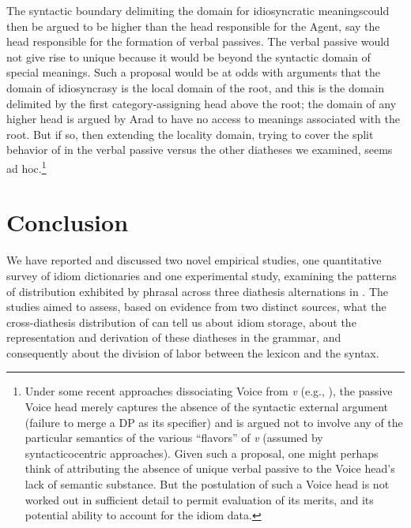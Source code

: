\documentclass[output=paper]{langsci/langscibook}
\begin{document}
The syntactic boundary delimiting the domain for idiosyncratic meanings\linebreak could
then be argued to be higher than the head responsible for the Agent, say the
head responsible for the formation of verbal passives. The verbal
passive would not give rise to unique  because it would
be beyond the syntactic domain of special meanings. Such a proposal would be at
odds with  arguments that the domain of idiosyncrasy is the
local domain of the root, and this is the domain delimited by the first
category-assigning head above the root; the domain of any higher head is argued
by Arad to have no access to meanings associated with the root. But if so, then
extending the locality domain, trying to cover the split behavior of
 in the verbal passive versus the other diatheses we examined,
seems ad hoc.\footnote{Under some recent approaches dissociating Voice from
    \emph{v} (e.g., \citealt{Harley2013}), the passive Voice head
    merely captures the absence of the syntactic external argument (failure to
    merge a DP as its specifier) and is argued not to involve any of the
    particular semantics of the various ``flavors'' of \emph{v} (assumed by
    syntacticocentric approaches). Given such a proposal, one might perhaps
    think of attributing the absence of unique verbal passive
     to the Voice head’s lack of semantic substance. But the
    postulation of such a Voice head is not worked out in sufficient detail to
permit evaluation of its merits, and its potential ability to account for the
idiom data.}

\section{Conclusion} %

We have reported and discussed two novel empirical studies, one quantitative
survey of idiom dictionaries and one experimental study, examining the patterns
of distribution exhibited by phrasal  across three diathesis alternations
in . The studies aimed to assess, based on evidence from two distinct
sources, what the cross-diathesis distribution of  can tell us about
idiom storage, about the representation and derivation of these diatheses in
the grammar, and consequently about the division of labor between the lexicon
and the syntax.
\end{document}
